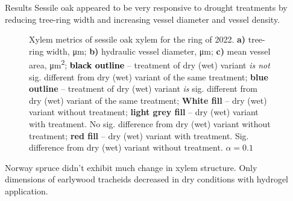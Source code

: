 \documentclass[final]{beamer}
\newlength{\sepwidth}
\newlength{\colwidth}
\newcommand{\separatorcolumn}{\begin{column}{\sepwidth}\end{column}}
\begin{document}
\begin{frame}[t]
\begin{columns}[t]
\begin{column}{\colwidth}
\end{column}


\begin{column}{\colwidth}

\begin{block}{Results}
Sessile oak appeared to be very responsive to drought treatments by reducing tree-ring width and increasing vessel diameter and vessel density.

\begin{figure}
    
    \caption{
        Xylem metrics of sessile oak xylem for the ring of 2022.
        \textbf{a)} tree-ring width, \si{\micro\meter};
        \textbf{b)} hydraulic vessel diameter, \si{\micro\meter};
        \textbf{c)} mean vessel area, \si{\micro\meter\squared};
        \textbf{\textcolor{black}{black outline}} -- treatment of dry (wet) variant \emph{is not} sig. different from dry (wet) variant of the same treatment;
        \textbf{\textcolor[RGB]{31,120,180}{blue outline}} -- treatment of dry (wet) variant \emph{is} sig. different from dry (wet) variant of the same treatment;
        \textbf{\colorbox{white}{White fill}} -- dry (wet) variant without treatment;
        \textbf{\colorbox{gray!10}{light grey fill}} -- dry (wet) variant with treatment. No sig. difference from dry (wet) variant without treatment;
        \textbf{\colorbox[RGB]{251,154,153}{red fill}} -- dry (wet) variant with treatment. Sig. difference from dry (wet) variant without treatment.
        $\alpha = 0.1$
    }
    \label{fig:oak_box}
\end{figure}

Norway spruce didn't exhibit much change in xylem structure. Only dimensions of earlywood tracheids decreased in dry conditions with hydrogel application.


\end{block}
\end{column}
\end{columns}
\end{frame}
\end{document}
